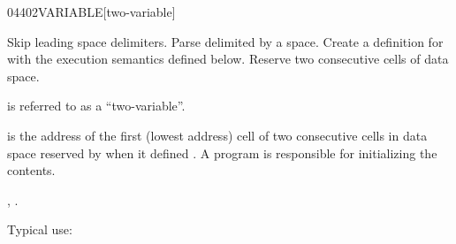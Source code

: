 \begin{worddef}{0440}{2VARIABLE}[two-variable]
\item {}

	Skip leading space delimiters. Parse  delimited by a
	space. Create a definition for  with the execution
	semantics defined below. Reserve two consecutive cells of data
	space.

	 is referred to as a ``two-variable''.

\execute[name]

	 is the address of the first (lowest address)
	cell of two consecutive cells in data space reserved by
	 when it defined . A program is
	responsible for initializing the contents.

\see {},
	.

	\begin{rationale} %
		Typical use:
			 
	\end{rationale}

	\begin{testing}
	\cbstart{}
		 \\
		 \\
		 \\
		 \\

		 \\
		 \\
		 \\
		 \\
	\cbend
	\end{testing}
\end{worddef}


